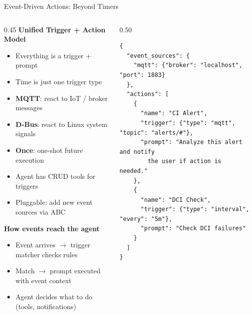 \documentclass[aspectratio=169,10pt]{beamer}
\begin{document}
\begin{frame}[fragile]{Event-Driven Actions: Beyond Timers}
\begin{columns}[T]
\begin{column}{0.45\textwidth}
\textbf{Unified Trigger + Action Model}
\begin{itemize}\scriptsize\setlength{\itemsep}{1pt}
  \item Everything is a \alert{trigger + prompt}
  \item Time is just one trigger type
  \item \textbf{MQTT}: react to IoT / broker messages
  \item \textbf{D-Bus}: react to Linux system signals
  \item \textbf{Once}: one-shot future execution
  \item Agent has CRUD tools for triggers
  \item Pluggable: add new event sources via ABC
\end{itemize}

\smallskip
\textbf{How events reach the agent}
\begin{itemize}\scriptsize\setlength{\itemsep}{1pt}
  \item Event arrives $\to$ trigger matcher checks rules
  \item Match $\to$ prompt executed with event context
  \item Agent decides what to do (tools, notifications)
\end{itemize}
\end{column}
\begin{column}{0.50\textwidth}
\begin{lstlisting}[style=json,basicstyle=\ttfamily\fontsize{5}{6}\selectfont,title={\scriptsize event-schedules.json}]
{
  "event_sources": {
    "mqtt": {"broker": "localhost", "port": 1883}
  },
  "actions": [
    {
      "name": "CI Alert",
      "trigger": {"type": "mqtt", "topic": "alerts/#"},
      "prompt": "Analyze this alert and notify
        the user if action is needed."
    },
    {
      "name": "DCI Check",
      "trigger": {"type": "interval", "every": "5m"},
      "prompt": "Check DCI failures"
    }
  ]
}
\end{lstlisting}
\end{column}
\end{columns}
\end{frame}

\end{document}
